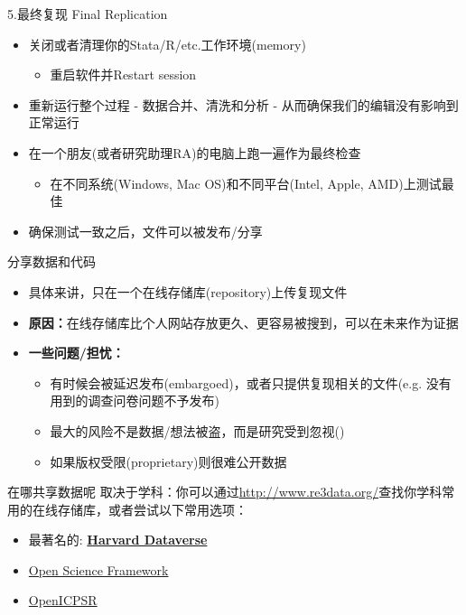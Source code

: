 \documentclass{beamer}
\begin{document}
\begin{frame}{5.最终复现 Final Replication}
\label{final.rep}
\begin{itemize}
    \item 关闭或者清理你的Stata/R/etc.工作环境(memory)
    \begin{itemize}
        \item 重启软件并Restart session
    \end{itemize}
    \item 重新运行整个过程 - 数据合并、清洗和分析 - 从而确保我们的编辑没有影响到正常运行
    \item 在一个朋友(或者研究助理RA)的电脑上跑一遍作为最终检查
    \begin{itemize}
        \item 在不同系统(Windows, Mac OS)和不同平台(Intel, Apple, AMD)上测试最佳
    \end{itemize}
    \item 确保测试一致之后，文件可以被发布/分享
\end{itemize}
\end{frame}

\begin{frame}{分享数据和代码}
\begin{itemize}
    \item 具体来讲，只在一个在线存储库(repository)上传复现文件
    \item \textbf{原因：}在线存储库比个人网站存放更久、更容易被搜到，可以在未来作为证据
    \item \textbf{一些问题/担忧：}
    \begin{itemize}
        \item 有时候会被延迟发布(embargoed)，或者只提供复现相关的文件(e.g. 没有用到的调查问卷问题不予发布)
        \item 最大的风险不是数据/想法被盗，而是研究受到忽视(\cite{King95})
        \item 如果版权受限(proprietary)则很难公开数据
    \end{itemize}
\end{itemize}
\end{frame}

\begin{frame}{在哪共享数据呢}
取决于学科：你可以通过\url{http://www.re3data.org/}查找你学科常用的在线存储库，或者尝试以下常用选项：
\begin{itemize}
    \item 最著名的: \href{https://dataverse.harvard.edu/}{\textbf{Harvard Dataverse}}
    \item \href{https://osf.io/}{Open Science Framework}
    \item \href{https://www.openicpsr.org/openicpsr/}{OpenICPSR}
\end{itemize}
\end{frame}
\end{document}
